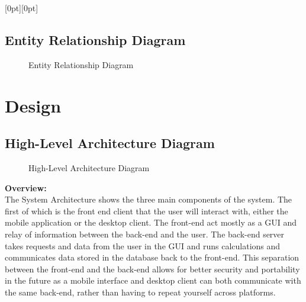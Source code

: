 \documentclass[a4paper]{article}
\newcommand{\Lpagenumber}{\ifdim\textwidth=\linewidth\else\bgroup
  \thispagestyle{empty}
  \dimendef\margin=0
  \ifodd\value{page}\margin=\oddsidemargin
  \else\margin=\evensidemargin
  \fi
  \raisebox{\dimexpr -\topmargin-\headheight-\headsep-0.5\linewidth}[0pt][0pt]{%
    \rlap{\hspace{\dimexpr \margin+\textheight+\footskip}%
    \llap{\rotatebox{0}{\thepage}}}}%
\egroup\fi}
\begin{document}
\begin{landscape}
\Lpagenumber
\subsection{Entity Relationship Diagram}
\begin{figure}[!ht] 
    \centering{} 
    \caption{Entity Relationship Diagram}
    \label{fig:erd}
\end{figure}
\end{landscape}

\section{Design}
\subsection{High-Level Architecture Diagram}
\begin{figure}[!ht] 
    \centering{} 
    \caption{High-Level Architecture Diagram}
    \label{fig:arch}
\end{figure}

\textbf{Overview:} \\
The System Architecture shows the three main components of the system. The first of which is the front end client that the user will interact with, either the mobile application or the desktop client. The front-end act mostly as a GUI and relay of information between the back-end and the user. The back-end server takes requests and data from the user in the GUI and runs calculations and communicates data stored in the database back to the front-end. This separation between the front-end and the back-end allows for better security and portability in the future as a mobile interface and desktop client can both communicate with the same back-end, rather than having to repeat yourself across platforms.
\end{document}
